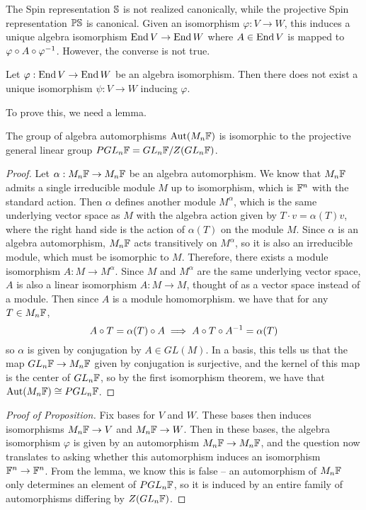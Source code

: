 The Spin representation $\S$ is not realized canonically,
while the projective Spin representation $\P\S$ is canonical. Given
an isomorphism $\varphi : V \to W$, this induces a unique algebra isomorphism
$\End V \to \End W$ where $A \in \End V$ is mapped to
$\varphi \circ A \circ \varphi\inv$. However, the converse is not true.
%
\begin{prop}
Let $\varphi : \End V \to \End W$ be an algebra isomorphism. Then there does
not exist a unique isomorphism $\psi : V \to W$ inducing $\varphi$.
\end{prop}
%
To prove this, we need a lemma.
%
\begin{lem}
The group of algebra automorphisms $\Aut(M_n\F)$ is isomorphic to the
projective general linear group $PGL_n\F = GL_n\F / Z(GL_n\F)$.
\end{lem}
%
\begin{proof}
Let $\alpha : M_n\F \to M_n\F$ be an algebra automorphism. We know that
$M_n\F$ admits a single irreducible module $M$ up to isomorphism,
which is $\F^n$ with the standard action. Then $\alpha$ defines another module
$M^\alpha$, which is the same underlying vector space as $M$ with the algebra
action given by $T \cdot v = \alpha(T)v$, where the right hand side is the action of
$\alpha(T)$ on the module $M$. Since $\alpha$ is an algebra automorphism,
$M_n\F$ acts transitively on $M^\alpha$, so it is also an irreducible module,
which must be isomorphic to $M$. Therefore, there exists a module isomorphism
$A : M \to M^\alpha$. Since $M$ and $M^\alpha$ are the same underlying vector
space, $A$ is also a linear isomorphism $A : M \to M$, thought of as a vector space
instead of a module. Then since $A$ is a module homomorphism. we have that
for any $T \in M_n\F$,
\[
A \circ T = \alpha(T) \circ A \implies A \circ T \circ A\inv = \alpha(T)
\]
so $\alpha$ is given by conjugation by $A \in GL(M)$. In a basis, this
tells us that the map $GL_n\F \to M_n\F$ given by conjugation is surjective,
and the kernel of this map is the center of $GL_n\F$, so by the first isomorphism
theorem, we have that $\Aut(M_n\F) \cong PGL_n\F$.
\end{proof}
%
\begin{proof}[Proof of Proposition]
Fix bases for $V$ and $W$. These bases then induces isomorphisms
$M_n\F \to V$ and $M_n\F \to W$. Then in these bases, the algebra
isomorphism $\varphi$ is given by an automorphism $M_n\F \to M_n\F$, and
the question now translates to asking whether this automorphism induces
an isomorphism $\F^n \to \F^n$. From the lemma, we know this is false -- an
automorphism of $M_n\F$ only determines an element of $PGL_n\F$, so it
is induced by an entire family of automorphisms differing by $Z(GL_n\F)$.
\end{proof}
